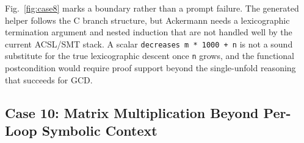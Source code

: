 Fig.~\ref{fig:case8} marks a boundary rather than a prompt failure. The generated helper follows the C branch structure, but Ackermann needs a lexicographic termination argument and nested induction that are not handled well by the current ACSL/SMT stack. A scalar \texttt{decreases m * 1000 + n} is not a sound substitute for the true lexicographic descent once \texttt{n} grows, and the functional postcondition would require proof support beyond the single-unfold reasoning that succeeds for GCD.

\subsection{Case 10: Matrix Multiplication Beyond Per-Loop Symbolic Context}
\label{app:case-matmul}


